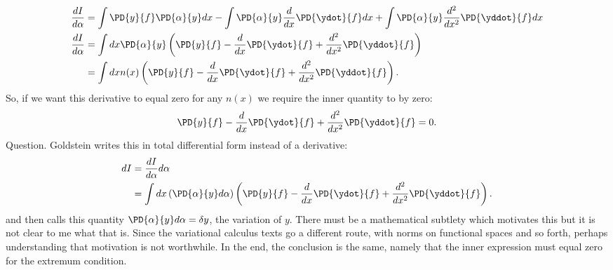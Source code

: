 {\begin{equation}
\begin{aligned}
\frac{dI}{d\alpha} &=
  \int \PD{y}{f} \PD{\alpha}{y} d x
- \int \PD{\alpha}{y} \frac{d}{ d x} \PD{\ydot}{f} d x
+ \int \PD{\alpha}{y} \frac{d^2}{dx^2} \PD{\yddot}{f} d x \\
\frac{dI}{d\alpha}
&= \int d x \PD{\alpha}{y} \left( \PD{y}{f} - \frac{d}{ d x} \PD{\ydot}{f} + \frac{d^2}{dx^2} \PD{\yddot}{f} \right) \\
&= \int d x n(x) \left( \PD{y}{f} - \frac{d}{ d x} \PD{\ydot}{f} + \frac{d^2}{dx^2} \PD{\yddot}{f} \right).
\end{aligned}
\end{equation}
%
So, if we want this derivative to equal zero for any \(n(x)\) we require the inner quantity to by zero:
%
\begin{equation}
\PD{y}{f} - \frac{d}{ d x} \PD{\ydot}{f} + \frac{d^2}{dx^2} \PD{\yddot}{f} = 0.
\end{equation}
%
Question.  Goldstein writes this in total differential form instead of a derivative:
%
\begin{equation}\label{eqn:goldsteinCh12:980}
\begin{aligned}
dI &= \frac{dI}{d\alpha} d\alpha \\
&= \int d x \left(\PD{\alpha}{y} d \alpha\right) \left( \PD{y}{f} - \frac{d}{ d x} \PD{\ydot}{f} + \frac{d^2}{dx^2} \PD{\yddot}{f} \right) .
\end{aligned}
\end{equation}
%
and then calls this quantity \(\PD{\alpha}{y} d \alpha = \delta y\), the variation of \(y\).  There must be a mathematical subtlety which motivates this
but it is not clear to me what that is.  Since the variational calculus texts go a different route, with norms on functional spaces and so forth, perhaps
understanding that motivation is not worthwhile.  In the end, the conclusion is the same, namely that the inner expression must equal zero for the extremum
condition.
}
